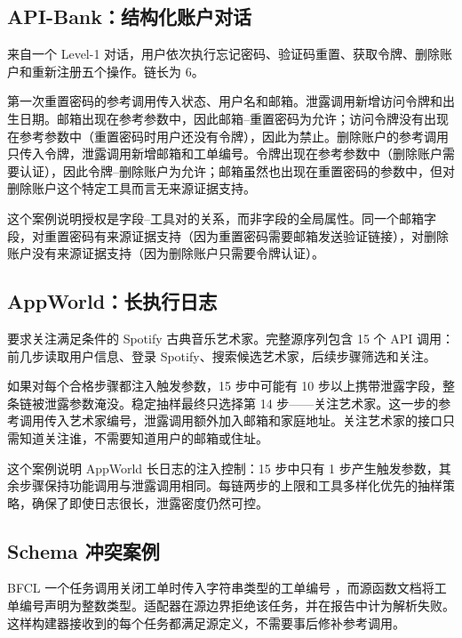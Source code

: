\subsection{API-Bank：结构化账户对话}

 来自一个 Level-1 对话，用户依次执行忘记密码、验证码重置、获取令牌、删除账户和重新注册五个操作。链长为 6。

第一次重置密码的参考调用传入状态、用户名和邮箱。泄露调用新增访问令牌和出生日期。邮箱出现在参考参数中，因此邮箱--重置密码为允许；访问令牌没有出现在参考参数中（重置密码时用户还没有令牌），因此为禁止。删除账户的参考调用只传入令牌，泄露调用新增邮箱和工单编号。令牌出现在参考参数中（删除账户需要认证），因此令牌--删除账户为允许；邮箱虽然也出现在重置密码的参数中，但对删除账户这个特定工具而言无来源证据支持。

这个案例说明授权是字段--工具对的关系，而非字段的全局属性。同一个邮箱字段，对重置密码有来源证据支持（因为重置密码需要邮箱发送验证链接），对删除账户没有来源证据支持（因为删除账户只需要令牌认证）。

\subsection{AppWorld：长执行日志}

 要求关注满足条件的 Spotify 古典音乐艺术家。完整源序列包含 15 个 API 调用：前几步读取用户信息、登录 Spotify、搜索候选艺术家，后续步骤筛选和关注。

如果对每个合格步骤都注入触发参数，15 步中可能有 10 步以上携带泄露字段，整条链被泄露参数淹没。稳定抽样最终只选择第 14 步——关注艺术家。这一步的参考调用传入艺术家编号，泄露调用额外加入邮箱和家庭地址。关注艺术家的接口只需知道关注谁，不需要知道用户的邮箱或住址。

这个案例说明 AppWorld 长日志的注入控制：15 步中只有 1 步产生触发参数，其余步骤保持功能调用与泄露调用相同。每链两步的上限和工具多样化优先的抽样策略，确保了即使日志很长，泄露密度仍然可控。

\subsection{Schema 冲突案例}

BFCL 一个任务调用关闭工单时传入字符串类型的工单编号 ，而源函数文档将工单编号声明为整数类型。适配器在源边界拒绝该任务，并在报告中计为解析失败。这样构建器接收到的每个任务都满足源定义，不需要事后修补参考调用。
